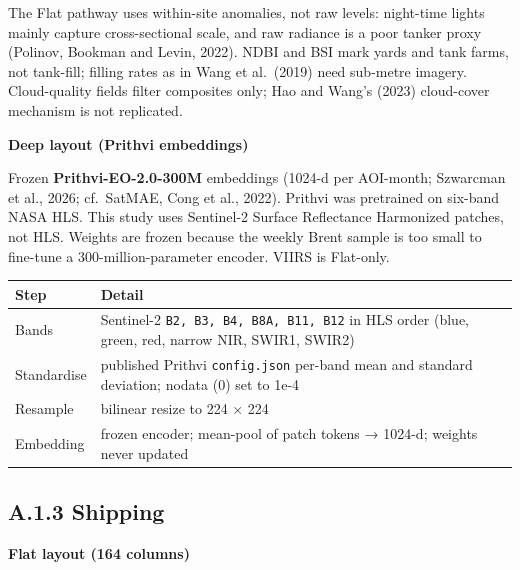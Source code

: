 \documentclass[
  british,
  12pt,
  oneside]{book}
\newcounter{none} %
\begin{document}
{The Flat pathway uses within-site anomalies, not raw levels: night-time
lights mainly capture cross-sectional scale, and raw radiance is a poor
tanker proxy (Polinov, Bookman and Levin, 2022). NDBI and BSI mark yards
and tank farms, not tank-fill; filling rates as in Wang et al.~(2019)
need sub-metre imagery. Cloud-quality fields filter composites only;
Hao and Wang's (2023) cloud-cover mechanism is not replicated.

\textbf{Deep layout (Prithvi embeddings)}

Frozen \textbf{Prithvi-EO-2.0-300M} embeddings (1024-d per AOI-month; Szwarcman
et al., 2026; cf.~SatMAE, Cong et al., 2022). Prithvi was pretrained on
six-band NASA HLS. This study uses Sentinel-2 Surface Reflectance
Harmonized patches, not HLS. Weights are frozen because the weekly Brent
sample is too small to fine-tune a 300-million-parameter encoder. VIIRS
is Flat-only.

{\def\LTcaptype{none} %
\begin{longtable}[]{@{}
  >{\raggedright\arraybackslash}p{}
  >{\raggedright\arraybackslash}p{}@{}}
\toprule\noalign{}
\begin{minipage}[b]{\linewidth}\raggedright
Step
\end{minipage} & \begin{minipage}[b]{\linewidth}\raggedright
Detail
\end{minipage} \\
\midrule\noalign{}
\endhead
\bottomrule\noalign{}
\endlastfoot
Bands & Sentinel-2 \texttt{B2,\ B3,\ B4,\ B8A,\ B11,\ B12} in HLS order (blue, green, red, narrow NIR, SWIR1, SWIR2) \\
Standardise & published Prithvi \texttt{config.json} per-band mean and standard deviation; nodata (0) set to 1e-4 \\
Resample & bilinear resize to 224 × 224 \\
Embedding & frozen encoder; mean-pool of patch tokens → 1024-d; weights never updated \\
\end{longtable}
}

\subsection*{A.1.3 Shipping}\label{a.1.3-shipping}

\textbf{Flat layout (164 columns)}

}
\end{document}
